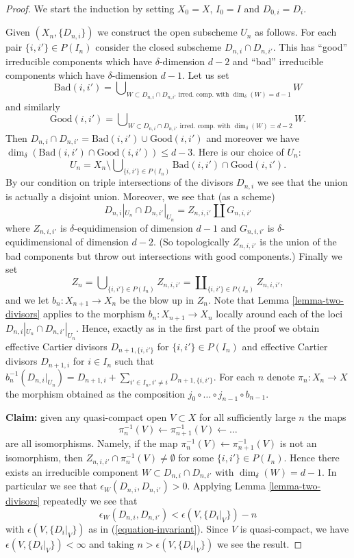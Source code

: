 \begin{proof}
\medskip\noindent
We start the induction by setting $X_0 = X$,
$I_0 = I$ and $D_{0, i} = D_i$.

\medskip\noindent
Given $(X_n, \{D_{n, i}\})$ we construct the open subscheme
$U_n$ as follows. For each pair $\{i, i'\} \in P(I_n)$ consider
the closed subscheme $D_{n, i} \cap D_{n, i'}$. This has ``good''
irreducible components which have $\delta$-dimension $d - 2$ and
``bad'' irreducible components which have $\delta$-dimension $d - 1$.
Let us set
$$
\text{Bad}(i, i')
=
\bigcup\nolimits_{W \subset D_{n, i} \cap D_{n, i'}
\text{ irred.\ comp. with }\dim_\delta(W) = d - 1} W
$$
and similarly
$$
\text{Good}(i, i')
=
\bigcup\nolimits_{W \subset D_{n, i} \cap D_{n, i'}
\text{ irred.\ comp. with }\dim_\delta(W) = d - 2} W.
$$
Then $D_{n, i} \cap D_{n, i'} = \text{Bad}(i, i') \cup \text{Good}(i, i')$
and moreover we have
$\dim_\delta(\text{Bad}(i, i') \cap \text{Good}(i, i')) \leq d - 3$.
Here is our choice of $U_n$:
$$
U_n
=
X_n
\setminus
\bigcup\nolimits_{\{i, i'\} \in P(I_n)}
\text{Bad}(i, i') \cap \text{Good}(i, i').
$$
By our condition on triple intersections of the divisors $D_{n, i}$
we see that the union is actually a disjoint union. Moreover,
we see that (as a scheme)
$$
D_{n, i}|_{U_n} \cap D_{n, i'}|_{U_n}
=
Z_{n, i, i'} \amalg G_{n, i, i'}
$$
where $Z_{n, i, i'}$ is $\delta$-equidimension of dimension $d - 1$
and $G_{n, i, i'}$ is $\delta$-equidimensional of dimension $d - 2$.
(So topologically $Z_{n, i, i'}$ is the union of the bad components
but throw out intersections with good components.) Finally we set
$$
Z_n =
\bigcup\nolimits_{\{i, i'\} \in P(I_n)} Z_{n, i, i'} =
\coprod\nolimits_{\{i, i'\} \in P(I_n)} Z_{n, i, i'},
$$
and we let $b_n : X_{n + 1} \to X_n$ be the blow up in $Z_n$.
Note that Lemma \ref{lemma-two-divisors}
applies to the morphism $b_n : X_{n + 1} \to X_n$ locally around
each of the loci $D_{n, i}|_{U_n} \cap D_{n, i'}|_{U_n}$. Hence,
exactly as in the first part of the proof we obtain effective
Cartier divisors $D_{n + 1, \{i, i'\}}$ for $\{i, i'\} \in P(I_n)$
and effective Cartier divisors $D_{n + 1, i}$ for $i \in I_n$
such that
$b_n^{-1}(D_{n, i}|_{U_n}) = D_{n + 1, i} +
\sum\nolimits_{i' \in I_n, i' \not = i} D_{n + 1, \{i, i'\}}$.
For each $n$ denote $\pi_n : X_n \to X$ the morphism obtained
as the composition $j_0 \circ \ldots \circ j_{n - 1} \circ b_{n - 1}$.

\medskip\noindent
{\bf Claim:} given any quasi-compact open $V \subset X$
for all sufficiently large $n$ the maps
$$
\pi_n^{-1}(V) \leftarrow \pi_{n + 1}^{-1}(V) \leftarrow \ldots
$$
are all isomorphisms. Namely, if the map
$\pi_n^{-1}(V) \leftarrow \pi_{n + 1}^{-1}(V)$ is not an isomorphism,
then $Z_{n, i, i'} \cap \pi_n^{-1}(V) \not = \emptyset$ for some
$\{i, i'\} \in P(I_n)$. Hence there exists an irreducible component
$W \subset D_{n, i} \cap D_{n, i'}$ with $\dim_\delta(W) = d - 1$.
In particular we see that $\epsilon_W(D_{n, i}, D_{n, i'}) > 0$.
Applying Lemma \ref{lemma-two-divisors} repeatedly we see that
$$
\epsilon_W(D_{n, i}, D_{n, i'})
<
\epsilon(V, \{D_i|_V\}) - n
$$
with $\epsilon(V, \{D_i|_V\})$ as in (\ref{equation-invariant}).
Since $V$ is quasi-compact, we have
$\epsilon(V, \{D_i|_V\}) < \infty$ and taking $n > \epsilon(V, \{D_i|_V\})$
we see the result.


\end{proof}
